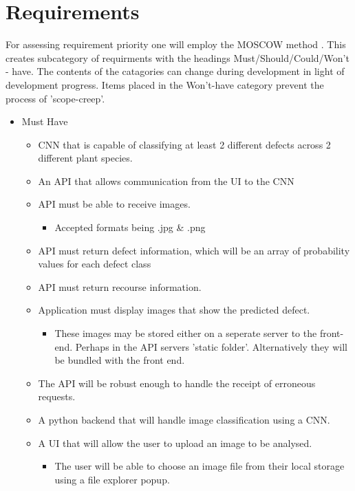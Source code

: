 \section{Requirements}
For assessing requirement priority one will employ the MOSCOW method \citep{Clegg199410.5555/561543}. This creates subcategory of requirments with the headings Must/Should/Could/Won't - have. The contents of the catagories can change during development in light of development progress. Items placed in the Won't-have category prevent the process of 'scope-creep'.
\begin{itemize}
  \item Must Have
  \begin{itemize}
    \item CNN that is capable of classifying at least 2 different defects
      across 2 different plant species.
    \item An API that allows communication from the UI to the CNN
    \item API must be able to receive images.
      \begin{itemize}
        \item Accepted formats being .jpg \& .png
      \end{itemize}
    \item API must return defect information, which will be an array of probability values for each defect class
    \item API must return recourse information.
    \item Application must display images that show the predicted defect.
      \begin{itemize}
        \item These images may be stored either on a seperate server to the front-end. Perhaps in the API servers 'static folder'. Alternatively they will be bundled with the front end.
      \end{itemize}
  	\item The API will be robust enough to handle the receipt of erroneous requests.
  	\item A python backend that will handle image classification using a CNN.
  	\item A UI that will allow the user to upload an image to be analysed.
    \begin{itemize}
      \item The user will be able to choose an image file from their local storage using a file explorer popup.
    \end{itemize}

\end{itemize}
\end{itemize}
